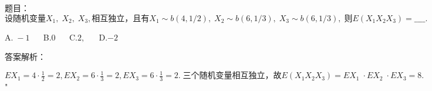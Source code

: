 题目：$\mathrm{设随机变量}X_1,\;X_2,\;X_3,\mathrm{相互独立}，\mathrm{且有}X_1\sim b(4,1/2),\;X_2\sim b(6,1/3),\;X_3\sim b(6,1/3),\;则E(X_1X_2X_3)=\_\_\_\_.$

A.$\;-1$ $\quad$ B.$0$ $\quad$ C.$2,$ $\quad$ D.$-2$

答案解析：

$EX_1=4\cdot\frac12=2,EX_2=6\cdot\frac13=2,EX_3=6\cdot\frac13=2.\;\mathrm{三个随机变量相互独立}，故E(X_1X_2X_3)=EX_1\;\cdot EX_2\;\cdot EX_3=8.$"